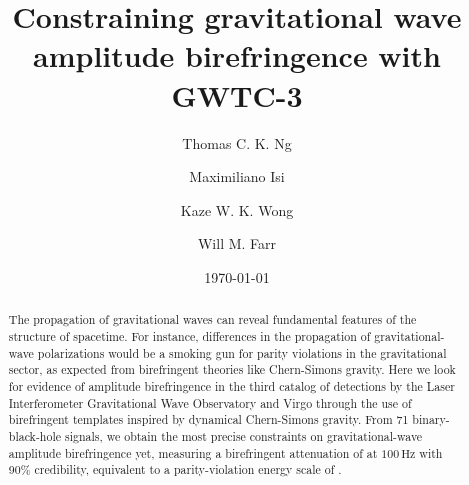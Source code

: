 \documentclass[aps,prd,twocolumn,superscriptaddress,preprintnumbers,nofootinbib]{revtex4-2}
\begin{document}
\title{Constraining gravitational wave amplitude birefringence with GWTC-3}

\author{Thomas C. K. Ng}

\author{Maximiliano Isi}

\author{Kaze W. K. Wong}

\author{Will M. Farr}

\date{\today}

\begin{abstract}
    The propagation of gravitational waves can reveal fundamental features of the structure of spacetime.
    For instance, differences in the propagation of gravitational-wave polarizations would be a smoking gun for parity violations in the gravitational sector, as expected from birefringent theories like Chern-Simons gravity.
    Here we look for evidence of amplitude birefringence in the third catalog of detections by the Laser Interferometer Gravitational Wave Observatory and Virgo through the use of birefringent templates inspired by dynamical Chern-Simons gravity.
    From 71 binary-black-hole signals, we obtain the most precise constraints on gravitational-wave amplitude birefringence yet, measuring a birefringent attenuation of  at $100 \, \mathrm{Hz}$ with 90\% credibility, equivalent to a parity-violation energy scale of .
\end{abstract}

\maketitle

\begin{acronym}
\end{acronym}
\end{document}
